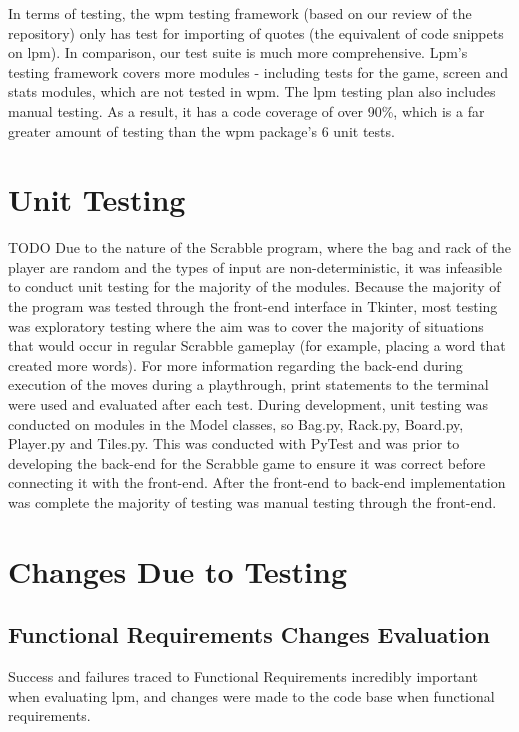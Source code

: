 \documentclass[12pt, titlepage]{article}
\begin{document}
In terms of testing, the wpm testing framework (based on our review of the repository) only has test for importing of quotes (the equivalent of code snippets on lpm). In comparison, our test suite is much more comprehensive. Lpm's testing framework covers more modules - including tests for the game, screen and stats modules, which are not tested in wpm. The lpm testing plan also includes manual testing. As a result, it has a code coverage of over 90\%, which is a far greater amount of testing than the wpm package's 6 unit tests.

\section{Unit Testing}
{\color{red}TODO}
Due to the nature of the Scrabble program, where the bag and rack of the player are random and the types of input are non-deterministic, it was infeasible to conduct unit testing for the majority of the modules. Because the majority of the program was tested through the front-end interface in Tkinter, most testing was exploratory testing where the aim was to cover the majority of situations that would occur in regular Scrabble gameplay (for example, placing a word that created more words). For more information regarding the back-end during execution of the moves during a playthrough, print statements to the terminal were used and evaluated after each test. During development, unit testing was conducted on modules in the Model classes, so Bag.py, Rack.py, Board.py, Player.py and Tiles.py. This was conducted with PyTest and was prior to developing the back-end for the Scrabble game to ensure it was correct before connecting it with the front-end. After the front-end to back-end implementation was complete the majority of testing was manual testing through the front-end.

\section{Changes Due to Testing}

\subsection{Functional Requirements Changes Evaluation}
Success and failures traced to Functional Requirements incredibly important when evaluating lpm, and changes were made to the code base when functional requirements. \\
\end{document}
